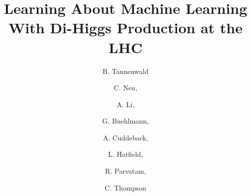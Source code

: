 \documentclass[a4paper,11pt]{article}
\title{\boldmath Learning About Machine Learning With Di-Higgs Production at the LHC}
\author[a]{B. Tannenwald}
\author[a]{C. Neu,}
\author[a]{A. Li,}
\author[a]{G. Buehlmann,}
\author[a]{A. Cuddeback,}
\author[a]{L. Hatfield,}
\author[a]{R. Parvatam,}
\author[a]{C. Thompson}
\affiliation[a]{University of Virginia, 248 McCormick Road, Charlottesville, VA, USA}
\begin{document}
 
\linenumbers
\maketitle
\flushbottom



%
%












%

%

\nocite{*} %
%

\cleardoublepage
{}

%




%
\end{document}
